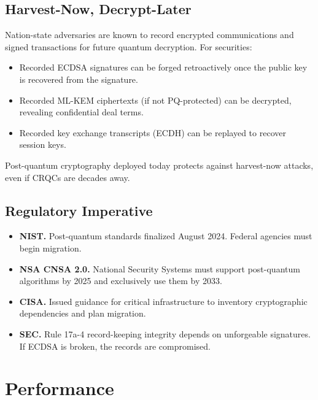 \documentclass[11pt,a4paper]{article}
\begin{document}
\subsection{Harvest-Now, Decrypt-Later}

Nation-state adversaries are known to record encrypted communications
and signed transactions for future quantum decryption.  For securities:

\begin{itemize}[nosep]
  \item Recorded ECDSA signatures can be forged retroactively once
        the public key is recovered from the signature.
  \item Recorded ML-KEM ciphertexts (if not PQ-protected) can be
        decrypted, revealing confidential deal terms.
  \item Recorded key exchange transcripts (ECDH) can be replayed to
        recover session keys.
\end{itemize}

Post-quantum cryptography deployed today protects against harvest-now
attacks, even if CRQCs are decades away.

\subsection{Regulatory Imperative}

\begin{itemize}[nosep]
  \item \textbf{NIST.}  Post-quantum standards finalized August 2024.
        Federal agencies must begin migration.
  \item \textbf{NSA CNSA 2.0.}  National Security Systems must support
        post-quantum algorithms by 2025 and exclusively use them by
        2033.
  \item \textbf{CISA.}  Issued guidance for critical infrastructure
        to inventory cryptographic dependencies and plan migration.
  \item \textbf{SEC.}  Rule 17a-4 record-keeping integrity depends
        on unforgeable signatures.  If ECDSA is broken, the records
        are compromised.
\end{itemize}

\section{Performance}
\label{sec:perf}
\end{document}
